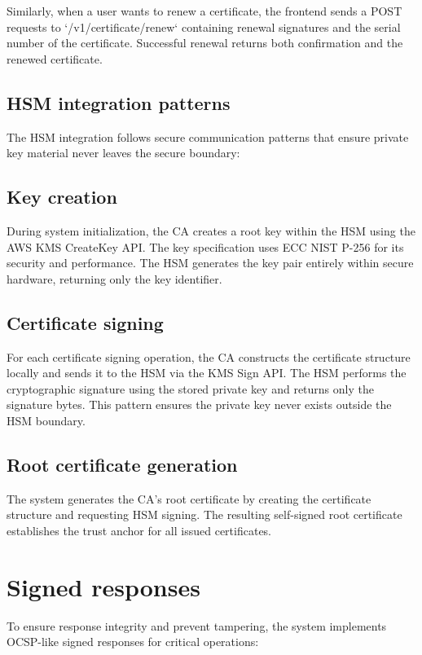 Similarly, when a user wants to renew a certificate, the frontend sends a POST 
requests to `/v1/certificate/renew` containing renewal signatures and the serial number of the 
certificate. Successful renewal returns both confirmation and the renewed certificate.

\subsection{HSM integration patterns}

The HSM integration follows secure communication patterns 
that ensure private key material never leaves the secure boundary:

\subsection{Key creation}
During system initialization, the CA creates a root key 
within the HSM using the AWS KMS CreateKey API. The key specification uses 
ECC NIST P-256 for its security and performance. The HSM generates the key 
pair entirely within secure hardware, returning only the key identifier.

\subsection{Certificate signing}
For each certificate signing operation, the CA 
constructs the certificate structure locally and sends it to the HSM via the 
KMS Sign API. The HSM performs the cryptographic signature using the stored 
private key and returns only the signature bytes. This pattern ensures the 
private key never exists outside the HSM boundary.

\subsection{Root certificate generation}
The system generates the CA's root certificate 
by creating the certificate structure and requesting HSM signing. The resulting 
self-signed root certificate establishes the trust anchor for all issued certificates.

\section{Signed responses}

To ensure response integrity and prevent tampering, the system implements 
OCSP-like signed responses for critical operations:

